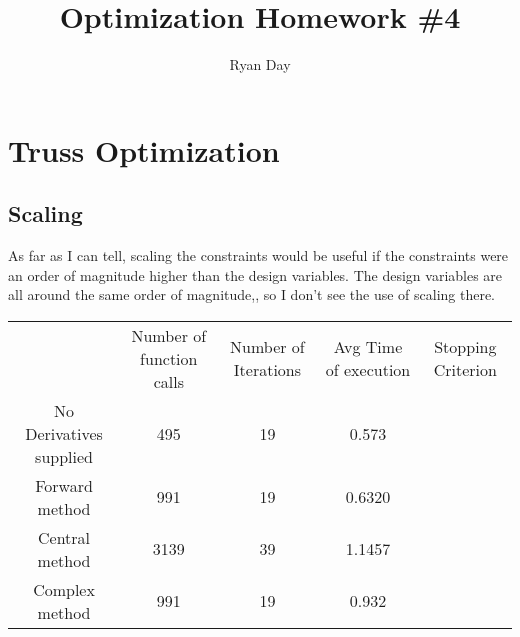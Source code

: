 \documentclass[a4paper]{article}
\author{Ryan Day}
\title{Optimization Homework \#4}
\begin{document}
    \maketitle
    \section{Truss Optimization}
    \subsection{Scaling}
    As far as I can tell, scaling the constraints would be useful if the constraints were an order of magnitude higher than the design variables.
    The design variables are all around the same order of magnitude,, so I don't see the use of scaling there.

    \begin{table}
        \begin{tabular}[h]{c c c c c}
            & Number of function calls & Number of Iterations & Avg Time of execution & Stopping Criterion \\
            No Derivatives supplied&495&19&0.573& \\
            Forward method&991&19&0.6320& \\
            Central method&3139&39&1.1457& \\ 
            Complex method&991&19&0.932&
            
        \end{tabular}
    \end{table}



\end{document}
